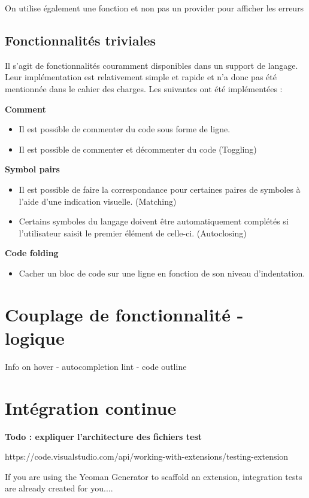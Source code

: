 \documentclass[
    iict, %
    il, %
]{heig-tb}
\begin{document}
On utilise également une fonction et non pas un provider pour afficher les erreurs


\section{Fonctionnalités triviales}
Il s'agit de fonctionnalités couramment disponibles dans un support de langage. Leur implémentation est relativement simple et rapide et n'a donc pas été mentionnée dans le cahier des charges.
Les suivantes ont été implémentées :

\textbf{Comment}
\begin{itemize}
    \item Il est possible de commenter du code sous forme de ligne.
    \item Il est possible de commenter et décommenter du code (Toggling)
\end{itemize}

\textbf{Symbol pairs}
\begin{itemize}
    \item Il est possible de faire la correspondance pour certaines paires de symboles à l'aide d'une indication visuelle. (Matching)
    \item Certains symboles du langage doivent être automatiquement complétés si l'utilisateur saisit le premier élément de celle-ci. (Autoclosing)
\end{itemize}

\textbf{Code folding}
\begin{itemize}
    \item Cacher un bloc de code sur une ligne en fonction de son niveau d'indentation.
\end{itemize}

\chapter{Couplage de fonctionnalité - logique}
Info on hover - autocompletion
lint - code outline

\chapter{Intégration continue}

\textbf{Todo : expliquer l'architecture des fichiers test}

https://code.visualstudio.com/api/working-with-extensions/testing-extension

If you are using the Yeoman Generator to scaffold an extension, integration tests are already created for you....
\end{document}
